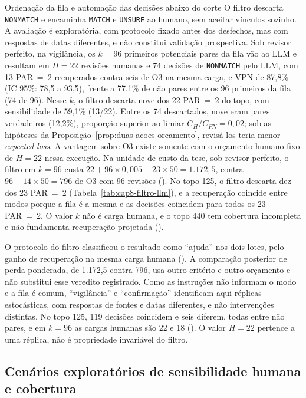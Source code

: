 \begin{chapter}{Ordenação da fila e automação das decisões abaixo do corte}
O filtro descarta \texttt{NONMATCH} e encaminha \texttt{MATCH} e \texttt{UNSURE} ao humano, sem aceitar vínculos sozinho. A avaliação é exploratória, com protocolo fixado antes dos desfechos, mas com respostas de datas diferentes, e não constitui validação prospectiva. Sob revisor perfeito, na vigilância, os $k=96$ primeiros potenciais pares da fila vão ao LLM e resultam em $H=22$ revisões humanas e 74 decisões de \texttt{NONMATCH} pelo LLM, com 13 PAR~=~2 recuperados contra seis de O3 na mesma carga, e VPN de 87,8\% (IC 95\%: 78,5 a 93,5), frente a 77,1\% de não pares entre os 96 primeiros da fila (74 de 96). Nesse $k$, o filtro descarta nove dos 22 PAR~=~2 do topo, com sensibilidade de 59,1\% (13/22). Entre os 74 descartados, nove eram pares verdadeiros (12,2\%), proporção superior ao limiar $C_H/C_{FN}=0{,}02$; sob as hipóteses da Proposição~\ref{prop:duas-acoes-orcamento}, revisá-los teria menor \textit{expected loss}. A vantagem sobre O3 existe somente com o orçamento humano fixo de $H=22$ nessa execução. Na unidade de custo da tese, sob revisor perfeito, o filtro em $k=96$ custa $22+96\times0{,}005+23\times50=1.172{,}5$, contra $96+14\times50=796$ de O3 com 96 revisões (). No topo 125, o filtro descarta dez dos 23 PAR~=~2 (Tabela~\ref{tab:cap8-filtro-llm}), e a recuperação coincide entre modos porque a fila é a mesma e as decisões coincidem para todos os 23 PAR~=~2. O valor $k$ não é carga humana, e o topo 440 tem cobertura incompleta e não fundamenta recuperação projetada ().

O protocolo do filtro classificou o resultado como ``ajuda'' nos dois lotes, pelo ganho de recuperação na mesma carga humana (). A comparação posterior de perda ponderada, de 1.172,5 contra 796, usa outro critério e outro orçamento e não substitui esse veredito registrado. Como as instruções não informam o modo e a fila é comum, ``vigilância'' e ``confirmação'' identificam aqui réplicas estocásticas, com respostas de fontes e datas diferentes, e não intervenções distintas. No topo 125, 119 decisões coincidem e seis diferem, todas entre não pares, e em $k=96$ as cargas humanas são 22 e 18 (). O valor $H=22$ pertence a uma réplica, não é propriedade invariável do filtro.

\subsection{Cenários exploratórios de sensibilidade humana e cobertura}\label{sec:e4-sensibilidade-humana}


\end{chapter}
